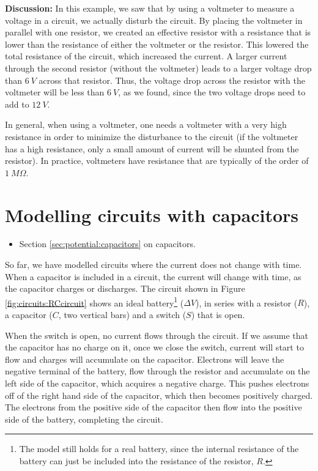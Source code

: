 \begin{example}
\textbf{Discussion: }In this example, we saw that by using a voltmeter to measure a voltage in a circuit, we actually disturb the circuit. By placing the voltmeter in parallel with one resistor, we created an effective resistor with a resistance that is lower than the resistance of either the voltmeter or the resistor. This lowered the total resistance of the circuit, which increased the current. A larger current through the second resistor (without the voltmeter) leads to a larger voltage drop than $\SI{6}{V}$ across that resistor. Thus, the voltage drop across the resistor with the voltmeter will be less than $\SI{6}{V}$, as we found, since the two voltage drops need to add to $\SI{12}{V}$.

In general, when using a voltmeter, one needs a voltmeter with a very high resistance in order to minimize the disturbance to the circuit (if the voltmeter has a high resistance, only a small amount of current will be shunted from the resistor). In practice, voltmeters have resistance that are typically of the order of $\SI{1}{M\Omega}$.
\end{example}


\section{Modelling circuits with capacitors}

\begin{review}
	\begin{itemize}
		\item Section \ref{sec:potential:capacitors} on capacitors.
	\end{itemize}
\end{review}
So far, we have modelled circuits where the current does not change with time. When a capacitor is included in a circuit, the current will change with time, as the capacitor charges or discharges. The circuit shown in Figure \ref{fig:circuits:RCcircuit} shows an ideal battery\footnote{The model still holds for a real battery, since the internal resistance of the battery can just be included into the resistance of the resistor, $R$.} ($\Delta V$), in series with a resistor ($R$), a capacitor ($C$, two vertical bars) and a switch ($S$) that is open. 


When the switch is open, no current flows through the circuit. If we assume that the capacitor has no charge on it, once we close the switch, current will start to flow and charges will accumulate on the capacitor. Electrons will leave the negative terminal of the battery, flow through the resistor and accumulate on the left side of the capacitor, which acquires a negative charge. This pushes electrons off of the right hand side of the capacitor, which then becomes positively charged. The electrons from the positive side of the capacitor then flow into the positive side of the battery, completing the circuit.

